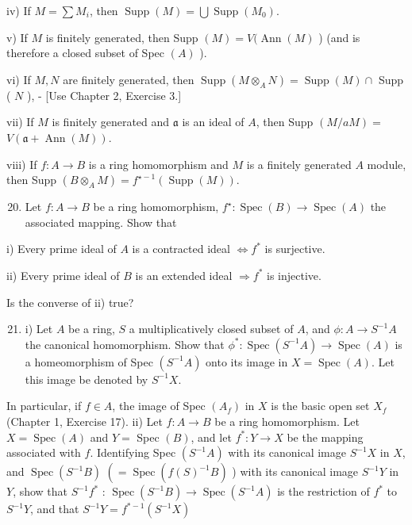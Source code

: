 \documentclass{standalone}
\theoremstyle{definition}
\theoremstyle{remark}
\begin{document}
iv) If $M=\sum M_{i}$, then $\operatorname{Supp}(M)=\bigcup \operatorname{Supp}\left(M_{0}\right)$.

v) If $M$ is finitely generated, then Supp $(M)=V(\operatorname{Ann}(M)$ ) (and is therefore a closed subset of Spec $(A)$ ).

vi) If $M, N$ are finitely generated, then $\operatorname{Supp}\left(M \otimes_{A} N\right)=\operatorname{Supp}(M) \cap$ Supp ( $N$ ), - [Use Chapter 2, Exercise 3.]

vii) If $M$ is finitely generated and $\mathfrak{a}$ is an ideal of $A$, then Supp $(M / a M)=$ $V(\mathfrak{a}+\operatorname{Ann}(M))$.

viii) If $f: A \rightarrow B$ is a ring homomorphism and $M$ is a finitely generated $A$ module, then Supp $\left(B \otimes_{A} M\right)=f^{\star-1}(\operatorname{Supp}(M))$.

\begin{enumerate}
  \setcounter{enumi}{19}
  \item Let $f: A \rightarrow B$ be a ring homomorphism, $f^{\star}: \operatorname{Spec}(B) \rightarrow \operatorname{Spec}(A)$ the associated mapping. Show that
\end{enumerate}

i) Every prime ideal of $A$ is a contracted ideal $\Leftrightarrow f^{*}$ is surjective.

ii) Every prime ideal of $B$ is an extended ideal $\Rightarrow f^{*}$ is injective.

Is the converse of ii) true?

\begin{enumerate}
  \setcounter{enumi}{20}
  \item i) Let $A$ be a ring, $S$ a multiplicatively closed subset of $A$, and $\phi: A \rightarrow S^{-1} A$ the canonical homomorphism. Show that $\phi^{*}: \operatorname{Spec}\left(S^{-1} A\right) \rightarrow \operatorname{Spec}(A)$ is a homeomorphism of Spec $\left(S^{-1} A\right)$ onto its image in $X=\operatorname{Spec}(A)$. Let this image be denoted by $S^{-1} X$.
\end{enumerate}

In particular, if $f \in A$, the image of Spec $\left(A_{f}\right)$ in $X$ is the basic open set $X_{f}$ (Chapter 1, Exercise 17). ii) Let $f: A \rightarrow B$ be a ring homomorphism. Let $X=\operatorname{Spec}(A)$ and $Y=$ Spec $(B)$, and let $f^{*}: Y \rightarrow X$ be the mapping associated with $f$. Identifying Spec $\left(S^{-1} A\right)$ with its canonical image $S^{-1} X$ in $X$, and $\operatorname{Spec}\left(S^{-1} B\right)$ $\left(=\operatorname{Spec}\left(f(S)^{-1} B\right)\right.$ ) with its canonical image $S^{-1} Y$ in $Y$, show that $S^{-1} f^{*}$ : $\operatorname{Spec}\left(S^{-1} B\right) \rightarrow \operatorname{Spec}\left(S^{-1} A\right)$ is the restriction of $f^{*}$ to $S^{-1} Y$, and that $S^{-1} Y=f^{*-1}\left(S^{-1} X\right)$
\end{document}

